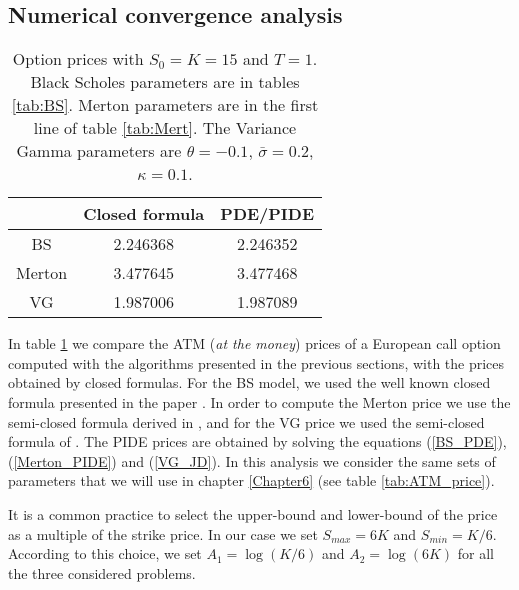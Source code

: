 \subsection{Numerical convergence analysis}\label{numerical_concergence_section}

\begin{table}[ht]
\centering
\begin{tabular}[t]{ccc}
\toprule
       &  \textbf{Closed formula} &  \textbf{PDE/PIDE} \\
\midrule
BS      &  2.246368  & 2.246352 \\
Merton  &  3.477645  & 3.477468 \\ 
VG      &  1.987006  & 1.987089 \\
\bottomrule
\end{tabular}
\caption{Option prices with $S_0=K=15$ and $T=1$. Black Scholes parameters are in tables \ref{tab:BS}. Merton parameters are in the first line of table \ref{tab:Mert}.
The Variance Gamma parameters are $\theta=-0.1$, $\bar \sigma = 0.2$, $\kappa = 0.1$.}
\label{tab:prices_BS_M_VG}
\end{table}%

In table \ref{tab:prices_BS_M_VG} we compare the ATM (\emph{at the money}) prices of a European call option computed with the algorithms presented 
in the previous sections, with the prices obtained by closed formulas.
For the BS model, we used the well known closed formula presented in the paper \cite{BS73}. 
In order to compute the Merton price we use the semi-closed formula derived in \cite{Me76},
and for the VG price we used the semi-closed formula of \cite{MCC98}. 
The PIDE prices are obtained by solving the equations (\ref{BS_PDE}), (\ref{Merton_PIDE}) and (\ref{VG_JD}).
In this analysis we consider the same sets of parameters that we will use in chapter \ref{Chapter6} (see table \ref{tab:ATM_price}).

It is a common practice to select the upper-bound and lower-bound of the price as a multiple of the strike price. 
In our case we set $S_{max} = 6K$ and $S_{min} = K/6$.
According to this choice, we set $A_1 = \log(K/6)$ and $A_2 = \log(6K)$ for all the three considered problems.
 
